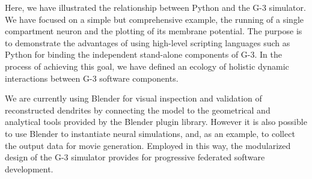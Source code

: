 \documentclass[12pt]{article}
\begin{document}
Here, we have illustrated the relationship between Python and the G-3
simulator.  We have focused on a simple but comprehensive example, the
running of a single compartment neuron and the plotting of its
membrane potential. The purpose is to demonstrate the advantages of
using high-level scripting languages such as Python for binding the
independent stand-alone components of G-3. In the process of achieving this goal, we have defined an ecology of holistic dynamic interactions between G-3 software components.


We are currently using Blender for visual inspection and validation of
reconstructed dendrites by connecting the model to the geometrical and
analytical tools provided by the Blender plugin library.  However it
is also possible to use Blender to instantiate neural simulations,
and, as an example, to collect the output data for movie generation.
Employed in this way, the modularized design of the G-3 simulator
provides for progressive federated software development.



\cleardoublepage
{}

%
%


\end{document}
